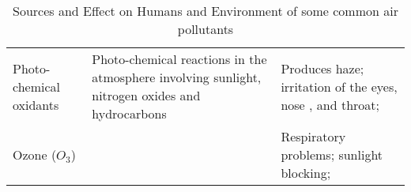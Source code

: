 \begin{table}
\begin{adjustbox}{width=\textwidth}
\begin{tabular}{|p{3.5cm}|p{6cm}|p{7cm}|}
        Photo-chemical oxidants & Photo-chemical reactions in the atmosphere involving sunlight, nitrogen oxides and hydrocarbons & Produces haze; irritation of the eyes, nose , and throat; \\
        Ozone ($O_3$) & &  Respiratory problems; sunlight blocking; \\
        \hline
    \end{tabular}
    \end{adjustbox}
    \caption{Sources and Effect on Humans and Environment of some common air pollutants}
\end{table}